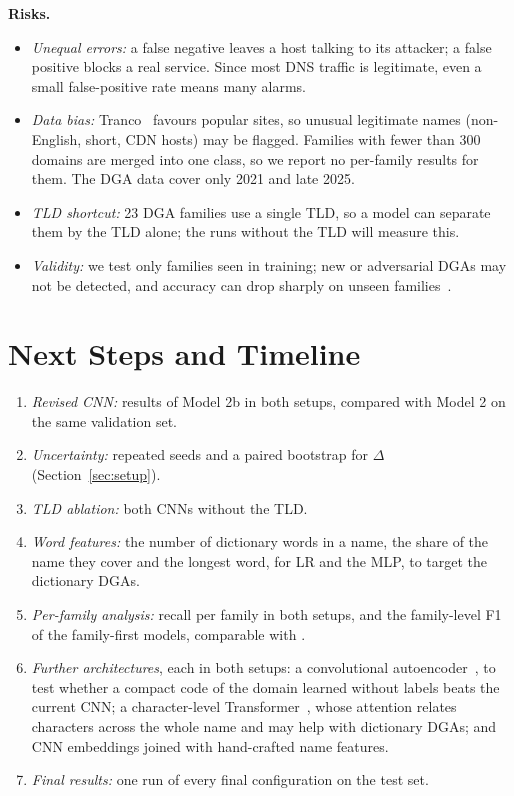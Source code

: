 \documentclass[11pt]{article}
\begin{document}
\textbf{Risks.}
\begin{itemize}
  \item \emph{Unequal errors:} a false negative leaves a host talking to its
  attacker; a false positive blocks a real service. Since most DNS traffic is
  legitimate, even a small false-positive rate means many alarms.
  \item \emph{Data bias:} Tranco~\cite{lepochat2019tranco} favours popular sites,
  so unusual legitimate names (non-English, short, CDN hosts) may be flagged.
  Families with fewer than 300 domains are merged into one class, so we report no
  per-family results for them. The DGA data cover only 2021 and late 2025.
  \item \emph{TLD shortcut:} 23 DGA families use a single TLD, so a model can
  separate them by the TLD alone; the runs without the TLD will measure this.
  \item \emph{Validity:} we test only families seen in training; new or
  adversarial DGAs may not be detected, and accuracy can drop sharply on unseen
  families~\cite{dahal2019autoencoded}.
\end{itemize}

\section{Next Steps and Timeline}\label{sec:next}
\begin{enumerate}
  \item \emph{Revised CNN:} results of Model 2b in both setups, compared with
  Model 2 on the same validation set.
  \item \emph{Uncertainty:} repeated seeds and a paired bootstrap for $\Delta$
  (Section~\ref{sec:setup}).
  \item \emph{TLD ablation:} both CNNs without the TLD.
  \item \emph{Word features:} the number of dictionary words in a name, the share
  of the name they cover and the longest word, for LR and the MLP, to target the
  dictionary DGAs.
  \item \emph{Per-family analysis:} recall per family in both setups, and the
  family-level F1 of the family-first models, comparable with
  \citet{gregorio2024incremental}.
  \item \emph{Further architectures}, each in both setups: a convolutional
  autoencoder~\cite{masci2011cae}, to test whether a compact code of the domain
  learned without labels beats the current CNN; a character-level
  Transformer~\cite{vaswani2017attention}, whose attention relates characters
  across the whole name and may help with dictionary DGAs; and CNN embeddings
  joined with hand-crafted name features.
  \item \emph{Final results:} one run of every final configuration on the test
  set.
\end{enumerate}
\end{document}
